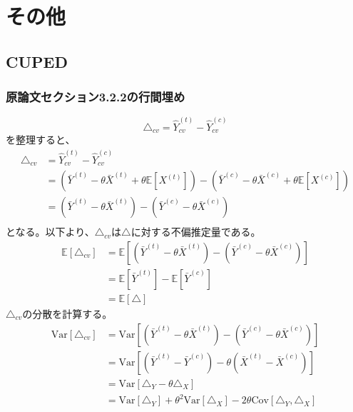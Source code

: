 \section{その他}

\subsection{CUPED}

\subsubsection{原論文セクション3.2.2の行間埋め}

\begin{equation}
    \triangle_{cv} = \hat{Y}_{cv}^{(t)} - \hat{Y}_{cv}^{(c)}
\end{equation}
を整理すると、
\begin{align}
    \triangle_{cv} & = \hat{Y}_{cv}^{(t)} - \hat{Y}_{cv}^{(c)}                                                                                                   \\
                   & = (\bar{Y}^{(t)} - \theta \bar{X}^{(t)} + \theta \mathbb{E}[X^{(t)}]) - (\bar{Y}^{(c)} - \theta \bar{X}^{(c)} + \theta \mathbb{E}[X^{(c)}]) \\
                   & = (\bar{Y}^{(t)} - \theta \bar{X}^{(t)}) - (\bar{Y}^{(c)} - \theta \bar{X}^{(c)})                                                           \\
\end{align}
となる。以下より、$\triangle_{cv}$は$\triangle$に対する不偏推定量である。
\begin{align}
    \mathbb{E}[\triangle_{cv}] & = \mathbb{E}[(\bar{Y}^{(t)} - \theta \bar{X}^{(t)}) - (\bar{Y}^{(c)} - \theta \bar{X}^{(c)})] \\
                               & = \mathbb{E}[\bar{Y}^{(t)}] - \mathbb{E}[\bar{Y}^{(c)}]                                       \\
                               & = \mathbb{E}[\triangle]
\end{align}
$\triangle_{cv}$の分散を計算する。
\begin{align}
    \text{Var}[\triangle_{cv}] & = \text{Var}[(\bar{Y}^{(t)} - \theta \bar{X}^{(t)}) - (\bar{Y}^{(c)} - \theta \bar{X}^{(c)})]                       \\
                               & = \text{Var}[(\bar{Y}^{(t)} - \bar{Y}^{(c)}) - \theta (\bar{X}^{(t)} - \bar{X}^{(c)})]                              \\
                               & = \text{Var}[\triangle_{Y} - \theta \triangle_{X}]                                                                  \\
                               & = \text{Var}[\triangle_{Y}] + \theta^{2}\text{Var}[\triangle_{X}] - 2\theta\text{Cov}[\triangle_{Y}, \triangle_{X}]
\end{align}
